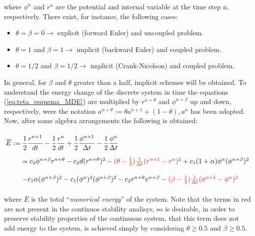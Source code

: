 where $\phi^{n}$ and $r^{n}$ are the potential and internal variable at the time step n, respectively. There exist, for instance, the following cases:

\begin{itemize}
\item $\theta = \beta = 0 \rightarrow$  explicit (forward Euler) and uncoupled problem.
\item $\theta = 1$ and $\beta = 1 \rightarrow$ implicit (backward Euler) and coupled problem.
\item $\theta = 1/2$ and $\beta = 1/2 \rightarrow$ implicit (Crank-Nicolson) and coupled problem.  
\end{itemize}

In general, for $\beta$ and $\theta$ greater than a half, implicit schemes will be obtained. To understand the energy change of the discrete system in time the equations (\ref{eq:teta_esquema_MDE}) are multiplied by $r^{n + \theta}$ and $\phi^{n + \beta}$ up and down, respectively, were the notation $a^{n + \theta} := \theta a^{n+1} + (1 - \theta), a^n$ has been adopted. Now, after some algebra arrangements the following is obtained:

\begin{equation}
\arraycolsep=1.4pt\def\arraystretch{2.2}
\begin{array}{llr}
\overline{E}:= & \dfrac{1}{2} \dfrac{r^{n+1}}{dt} - \dfrac{1}{2} \dfrac{r^{n}}{dt} + \dfrac{1}{2} \dfrac{\phi^{n+1}}{\Delta t} - \dfrac{1}{2} \dfrac{\phi^{n}}{\Delta t} \\

& = c_2 \phi^{n + \beta} r^{n + \theta} 
- c_2 d (r^{n + \theta})^2 
- \red{(\theta - \frac{1}{2}) \frac{1}{\Delta t} (r^{n+1} - r^n)^2} 
+ c_1 (1 + \alpha) \phi^n (\phi^{n + \beta})^2 \\
& - c_1 \alpha (\phi^{n + \beta})^{2}
- c_1 (\phi^n)^2 (\phi^{n + \beta})^2
- c_2 r^{n + \theta} v^{n + \beta}
- \red{(\beta - \frac{1}{2}) \frac{1}{\Delta t} (\phi^{n+1} - \phi^n)^2 }
\end{array}
\end{equation}

where $\overline{E}$ is the total ``\textsl{numerical energy}'' of the system. Note that the terms in red are not present in the continuos stability analisys, so is desirable, in order to preserve stability properties of the continuous system, that this term does not add energy to the system, is achieved simply by considering $\theta \geqslant 0.5$ and $\beta \geqslant 0.5$.

